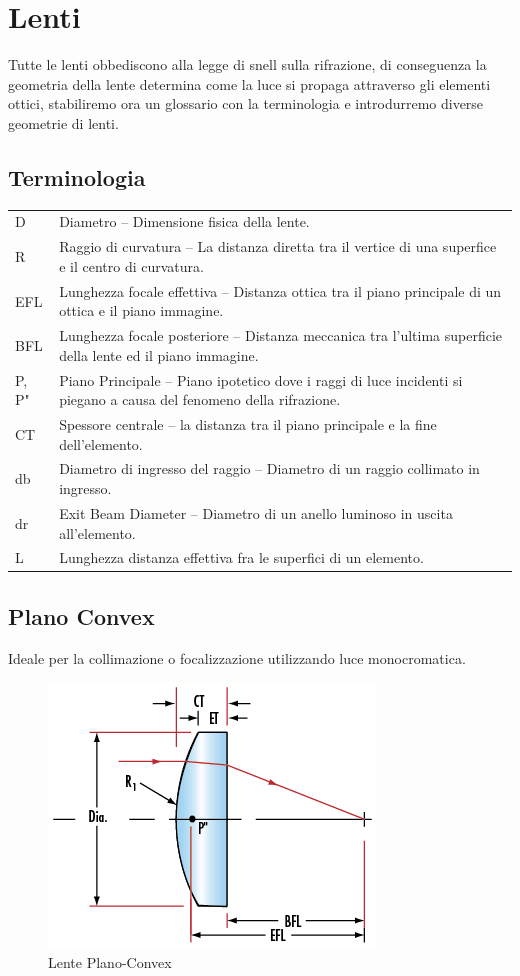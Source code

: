 \section{Lenti}
Tutte le lenti obbediscono alla legge di snell sulla rifrazione, di conseguenza la geometria della lente determina come la luce si propaga attraverso gli elementi ottici, stabiliremo ora un glossario con la terminologia e introdurremo diverse geometrie di lenti.

\subsection{Terminologia}

\begin{tabularx}{\textwidth}{l p{}}

D               & 	Diametro – Dimensione fisica della lente.\\
R               &	Raggio di curvatura – La distanza diretta tra il vertice di una superfice e il centro di curvatura.\\
EFL 	        &   Lunghezza focale effettiva – Distanza ottica tra il piano principale di un ottica e il piano immagine.\\
BFL 	        &   Lunghezza focale posteriore – Distanza meccanica tra l'ultima superficie della lente ed il piano immagine.\\
P, P" 	        &   Piano Principale – Piano ipotetico dove i raggi di luce incidenti si piegano a causa del fenomeno della rifrazione.\\
CT              & 	Spessore centrale – la distanza tra il piano principale e la fine dell'elemento.\\
db 	            &   Diametro di ingresso del raggio – Diametro di un raggio collimato in ingresso.\\
dr 	            &   Exit Beam Diameter – Diametro di un anello luminoso in uscita all'elemento.\\
L 	            &   Lunghezza distanza effettiva fra le superfici di un elemento.
\end{tabularx}

\subsection{Plano Convex}
Ideale per la collimazione o focalizzazione utilizzando luce monocromatica.
\begin{figure}[!ht]
\centering

\includegraphics[width=.3\textwidth]{img/plano-convex.png}

\caption{Lente Plano-Convex}
\label{fig:ccd-blockdiagram}
\end{figure}



